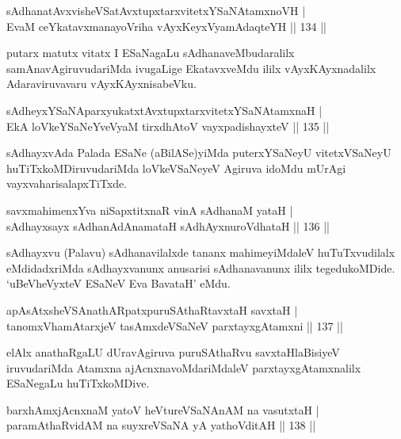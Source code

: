\begin{shl}
sAdhanatAvxvisheVSatAvxtupxtarxvitetxYSaNAtamxnoVH |\\
EvaM ceYkatavxmanayoVriha vAyxKeyxVyamAdaqteYH \hfill || 134 ||
\end{shl}

\begin{artha}
putarx matutx vitatx I ESaNagaLu sAdhanaveMbudaralilx samAnavAgiruvudariMda ivugaLige EkatavxveMdu ililx vAyxKAyxnadalilx Adaraviruvavaru vAyxKAyxnisabeVku.
\end{artha}

\begin{shl}
sAdheyxYSaNAparxyukatxtAvxtupxtarxvitetxYSaNAtamxnaH |\\
EkA loVkeYSaNeYveVyaM tirxdhA\s toV vayxpadishayxteV \hfill || 135 ||
\end{shl}

\begin{artha}
sAdhayxvAda Palada ESaNe (aBilASe)yiMda puterxYSaNeyU vitetxVSaNeyU huTiTxkoMDiruvudariMda loVkeVSaNeyeV Agiruva idoMdu mUrAgi vayxvaharisalapxTiTxde.
\end{artha}


\begin{shl}
savxmahimenxYva niSapxtitxnaR vinA sAdhanaM yataH |\\
sAdhayxsayx sAdhanAdAnamataH sAdhAyxnuroVdhataH \hfill || 136 ||
\end{shl}

\begin{artha}
sAdhayxvu (Palavu) sAdhanavilalxde tananx mahimeyiMdaleV huTuTxvudilalx eMdidadxriMda sAdhayxvanunx anusarisi sAdhanavanunx ililx tegedukoMDide. `uBeVheVyxteV ESaNeV Eva BavataH' eMdu.
\end{artha}%

\begin{shl}
apAsAtxsheVSAnathARpatxpuruSAthaRtavxtaH savxtaH |\\
tanomxVhamAtarxjeV tasAmxdeVSaNeV parxtayxgAtamxni \hfill || 137 ||
\end{shl}

\begin{artha}
elAlx anathaRgaLU dUravAgiruva puruSAthaRvu savxtaH\break laBisiyeV iruvudariMda Atamxna ajAcnxnavoMdariMdaleV parxtayxgAtamxnalilx ESaNegaLu huTiTxkoMDive.
\end{artha}

\begin{shl}
barxhAmxjAcnxnaM yatoV heVtureVSaNAnAM na vasutxtaH |\\
paramAthaRvidAM na suyxreVSaNA yA yathoVditAH \hfill || 138 ||
\end{shl}

